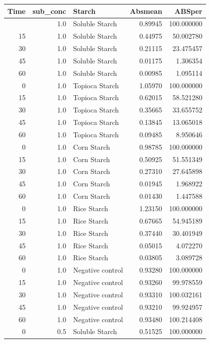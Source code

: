 \documentclass[
  12pt,
]{article}
\newcounter{none} %
\begin{document}
{\def\LTcaptype{none} %
\begin{longtable}[]{@{}rrlrr@{}}
\toprule\noalign{}
Time & sub\_conc & Starch & Absmean & ABSper \\
\midrule\noalign{}
\endhead
\bottomrule\noalign{}
\endlastfoot
0 & 1.0 & Soluble Starch & 0.89945 & 100.000000 \\
15 & 1.0 & Soluble Starch & 0.44975 & 50.002780 \\
30 & 1.0 & Soluble Starch & 0.21115 & 23.475457 \\
45 & 1.0 & Soluble Starch & 0.01175 & 1.306354 \\
60 & 1.0 & Soluble Starch & 0.00985 & 1.095114 \\
0 & 1.0 & Topioca Starch & 1.05970 & 100.000000 \\
15 & 1.0 & Topioca Starch & 0.62015 & 58.521280 \\
30 & 1.0 & Topioca Starch & 0.35665 & 33.655752 \\
45 & 1.0 & Topioca Starch & 0.13845 & 13.065018 \\
60 & 1.0 & Topioca Starch & 0.09485 & 8.950646 \\
0 & 1.0 & Corn Starch & 0.98785 & 100.000000 \\
15 & 1.0 & Corn Starch & 0.50925 & 51.551349 \\
30 & 1.0 & Corn Starch & 0.27310 & 27.645898 \\
45 & 1.0 & Corn Starch & 0.01945 & 1.968922 \\
60 & 1.0 & Corn Starch & 0.01430 & 1.447588 \\
0 & 1.0 & Rice Starch & 1.23150 & 100.000000 \\
15 & 1.0 & Rice Starch & 0.67665 & 54.945189 \\
30 & 1.0 & Rice Starch & 0.37440 & 30.401949 \\
45 & 1.0 & Rice Starch & 0.05015 & 4.072270 \\
60 & 1.0 & Rice Starch & 0.03805 & 3.089728 \\
0 & 1.0 & Negative control & 0.93280 & 100.000000 \\
15 & 1.0 & Negative control & 0.93260 & 99.978559 \\
30 & 1.0 & Negative control & 0.93310 & 100.032161 \\
45 & 1.0 & Negative control & 0.93210 & 99.924957 \\
60 & 1.0 & Negative control & 0.93480 & 100.214408 \\
0 & 0.5 & Soluble Starch & 0.51525 & 100.000000 \\

\end{longtable}}
\end{document}
